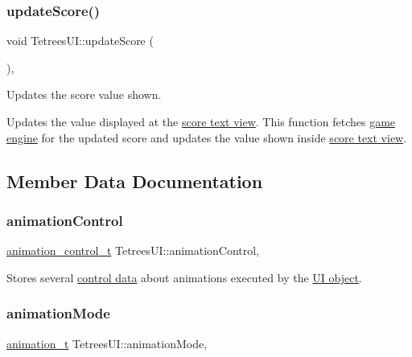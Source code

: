 \subsubsection{\texorpdfstring{update\+Score()}{updateScore()}}
{\footnotesize\ttfamily void Tetrees\+U\+I\+::update\+Score (\begin{DoxyParamCaption}{ }\end{DoxyParamCaption})\hspace{0.3cm}{\ttfamily [static]}, {\ttfamily [private]}}



Updates the score value shown. 

Updates the value displayed at the \hyperlink{TetreesUI_8cpp_aacb77432f2785bad4cb2dd55899b5336}{score text view}. This function fetches \hyperlink{classTetreesUI_a07faa56ea40b28beba7509fa7f65c897}{game engine} for the updated score and updates the value shown inside \hyperlink{TetreesUI_8cpp_aacb77432f2785bad4cb2dd55899b5336}{score text view}. 

\subsection{Member Data Documentation}
\mbox{\label{classTetreesUI_a06df6e44abd5d521448cf1299433b55c}} 
\subsubsection{\texorpdfstring{animation\+Control}{animationControl}}
{\footnotesize\ttfamily \hyperlink{structanimation__control__t}{animation\+\_\+control\+\_\+t} Tetrees\+U\+I\+::animation\+Control\hspace{0.3cm}{\ttfamily [static]}, {\ttfamily [private]}}

Stores several \hyperlink{structanimation__control__t}{control data} about animations executed by the \hyperlink{classTetreesEngine_a01bf1d438236d5f57129ffb22adf59ce}{UI object}. \mbox{\label{classTetreesUI_af3bd9b55da30d2b324c2dfe2d740d8a2}} 
\subsubsection{\texorpdfstring{animation\+Mode}{animationMode}}
{\footnotesize\ttfamily \hyperlink{TetreesDefs_8hpp_a10487f3bfa31fd7b7b8c20f403f8c947}{animation\+\_\+t} Tetrees\+U\+I\+::animation\+Mode\hspace{0.3cm}{\ttfamily [static]}, {\ttfamily [private]}}

